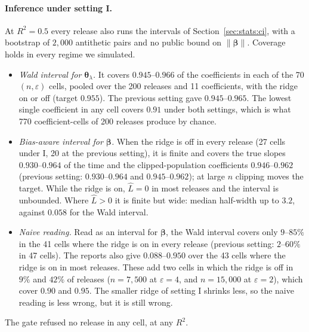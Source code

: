 \documentclass[11pt]{article}
\theoremstyle{definition}
\theoremstyle{plain}
\newcommand{\bbeta}{\boldsymbol{\beta}}
\newcommand{\btheta}{\boldsymbol{\theta}}
\begin{document}
\paragraph{Inference under setting I.} At $R^2 = 0.5$ every release also runs the intervals of Section~\ref{sec:stats:ci}, with a bootstrap of $2{,}000$ antithetic pairs and no public bound on $\|\bbeta\|$. Coverage holds in every regime we simulated.
\begin{itemize}[noitemsep]
  \item \emph{Wald interval for $\btheta_\lambda$.} It covers $0.945$--$0.966$ of the coefficients in each of the 70 $(n, \varepsilon)$ cells, pooled over the 200 releases and 11 coefficients, with the ridge on or off (target $0.955$). The previous setting gave $0.945$--$0.965$. The lowest single coefficient in any cell covers $0.91$ under both settings, which is what 770 coefficient-cells of 200 releases produce by chance.
  \item \emph{Bias-aware interval for $\bbeta$.} When the ridge is off in every release (27 cells under I, 20 at the previous setting), it is finite and covers the true slopes $0.930$--$0.964$ of the time and the clipped-population coefficients $0.946$--$0.962$ (previous setting: $0.930$--$0.964$ and $0.945$--$0.962$); at large $n$ clipping moves the target. While the ridge is on, $\hat L = 0$ in most releases and the interval is unbounded. Where $\hat L > 0$ it is finite but wide: median half-width up to $3.2$, against $0.058$ for the Wald interval.
  \item \emph{Naive reading.} Read as an interval for $\bbeta$, the Wald interval covers only $9$--$85\%$ in the 41 cells where the ridge is on in every release (previous setting: $2$--$60\%$ in 47 cells). The reports also give $0.088$--$0.950$ over the 43 cells where the ridge is on in most releases. These add two cells in which the ridge is off in $9\%$ and $42\%$ of releases ($n = 7{,}500$ at $\varepsilon = 4$, and $n = 15{,}000$ at $\varepsilon = 2$), which cover $0.90$ and $0.95$. The smaller ridge of setting I shrinks less, so the naive reading is less wrong, but it is still wrong.
\end{itemize}
The gate refused no release in any cell, at any $R^2$.
\end{document}
